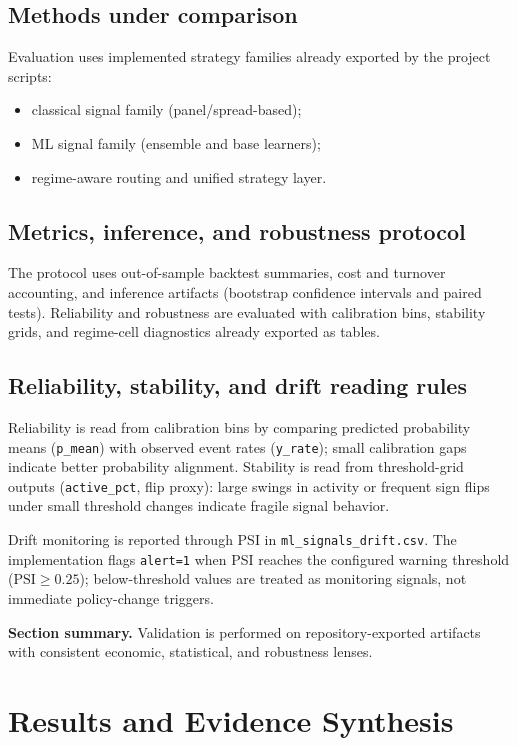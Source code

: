 \documentclass[a4paper,12pt]{extarticle}
\begin{document}
\subsection{Methods under comparison}

Evaluation uses implemented strategy families already exported by the project scripts:
\begin{itemize}
\item classical signal family (panel/spread-based);
\item ML signal family (ensemble and base learners);
\item regime-aware routing and unified strategy layer.
\end{itemize}

\subsection{Metrics, inference, and robustness protocol}

The protocol uses out-of-sample backtest summaries, cost and turnover accounting, and inference artifacts (bootstrap confidence intervals and paired tests). Reliability and robustness are evaluated with calibration bins, stability grids, and regime-cell diagnostics already exported as tables.

\subsection{Reliability, stability, and drift reading rules}

Reliability is read from calibration bins by comparing predicted probability means (\texttt{p\_mean}) with observed event rates (\texttt{y\_rate}); small calibration gaps indicate better probability alignment. Stability is read from threshold-grid outputs (\texttt{active\_pct}, flip proxy): large swings in activity or frequent sign flips under small threshold changes indicate fragile signal behavior.

Drift monitoring is reported through PSI in \texttt{ml\_signals\_drift.csv}. The implementation flags \texttt{alert=1} when PSI reaches the configured warning threshold (\(\text{PSI} \ge 0.25\)); below-threshold values are treated as monitoring signals, not immediate policy-change triggers.

\textbf{Section summary.} Validation is performed on repository-exported artifacts with consistent economic, statistical, and robustness lenses.

\section{Results and Evidence Synthesis}
\end{document}
